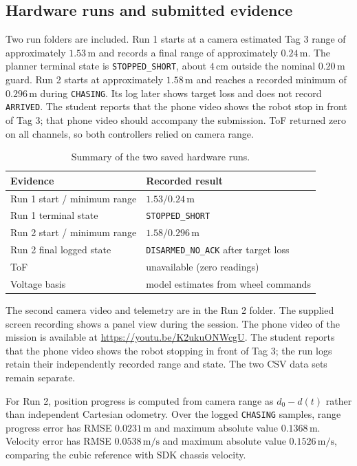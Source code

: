 \subsection{Hardware runs and submitted evidence}
Two run folders are included. Run 1 starts at a camera estimated Tag 3 range of approximately $1.53\,\mathrm{m}$ and records a final range of approximately $0.24\,\mathrm{m}$. The planner terminal state is \texttt{STOPPED\_SHORT}, about $4\,\mathrm{cm}$ outside the nominal $0.20\,\mathrm{m}$ guard. Run 2 starts at approximately $1.58\,\mathrm{m}$ and reaches a recorded minimum of $0.296\,\mathrm{m}$ during \texttt{CHASING}. Its log later shows target loss and does not record \texttt{ARRIVED}. The student reports that the phone video shows the robot stop in front of Tag 3; that phone video should accompany the submission. ToF returned zero on all channels, so both controllers relied on camera range.

\begin{table}[ht]
\centering
\caption{Summary of the two saved hardware runs.}
\begin{tabular}{ll}
\toprule
Evidence & Recorded result \\
\midrule
Run 1 start / minimum range & $1.53 / 0.24\,\mathrm{m}$ \\
Run 1 terminal state & \texttt{STOPPED\_SHORT} \\
Run 2 start / minimum range & $1.58 / 0.296\,\mathrm{m}$ \\
Run 2 final logged state & \texttt{DISARMED\_NO\_ACK} after target loss \\
ToF & unavailable (zero readings) \\
Voltage basis & model estimates from wheel commands \\
\bottomrule
\end{tabular}
\end{table}

The second camera video and telemetry are in the Run 2 folder. The supplied screen recording shows a panel view during the session. The phone video of the mission is available at \url{https://youtu.be/K2ukuONWcgU}. The student reports that the phone video shows the robot stopping in front of Tag 3; the run logs retain their independently recorded range and state. The two CSV data sets remain separate.

For Run 2, position progress is computed from camera range as $d_0-d(t)$ rather than independent Cartesian odometry. Over the logged \texttt{CHASING} samples, range progress error has RMSE $0.0231\,\mathrm{m}$ and maximum absolute value $0.1368\,\mathrm{m}$. Velocity error has RMSE $0.0538\,\mathrm{m/s}$ and maximum absolute value $0.1526\,\mathrm{m/s}$, comparing the cubic reference with SDK chassis velocity.

